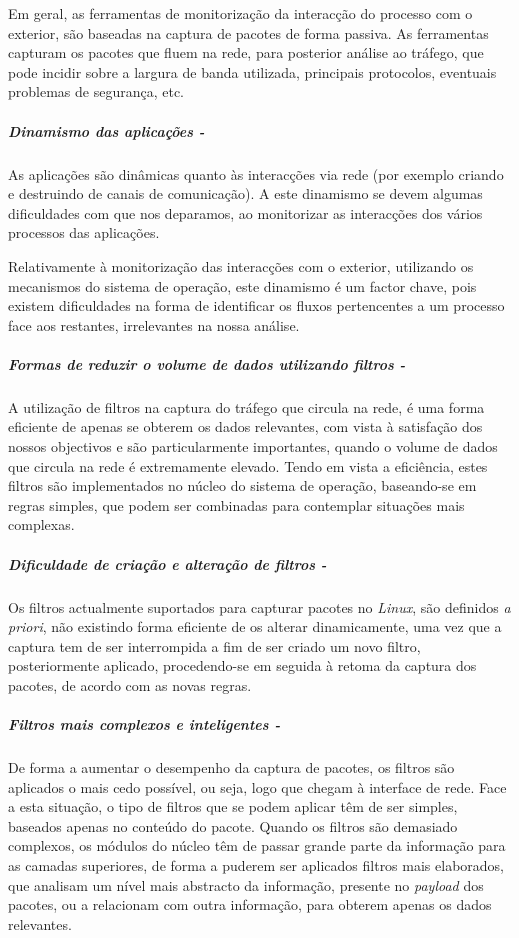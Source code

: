 Em geral, as ferramentas de monitorização da interacção do processo com o exterior, são baseadas na captura de pacotes de forma passiva.
As ferramentas capturam os pacotes que fluem na rede, para posterior análise ao tráfego, que pode incidir sobre a largura de banda utilizada, principais protocolos, eventuais problemas de segurança, etc.

\subparagraph*{Dinamismo das aplicações - }
As aplicações são dinâmicas quanto às interacções via rede (por exemplo criando e destruindo de canais de comunicação).
A este dinamismo se devem algumas dificuldades com que nos deparamos, ao monitorizar as interacções dos vários processos das aplicações.

Relativamente à monitorização das interacções com o exterior, utilizando os mecanismos do sistema de operação, este dinamismo é um factor chave, pois existem dificuldades na forma de identificar os fluxos pertencentes a um processo face aos restantes, irrelevantes na nossa análise.

\subparagraph*{Formas de reduzir o volume de dados utilizando filtros - }
A utilização de filtros na captura do tráfego que circula na rede, é uma forma eficiente de apenas se obterem os dados relevantes, com vista à satisfação dos nossos objectivos e são particularmente importantes, quando o volume de dados que circula na rede é extremamente elevado.
Tendo em vista a eficiência, estes filtros são implementados no núcleo do sistema de operação, baseando-se em regras simples, que podem ser combinadas para contemplar situações mais complexas.

\subparagraph*{Dificuldade de criação e alteração de filtros - }
Os filtros actualmente suportados para capturar pacotes no \textit{Linux}, são definidos \textit{a priori}, não existindo forma eficiente de os alterar dinamicamente, uma vez que a captura tem de ser interrompida a fim de ser criado um novo filtro, posteriormente aplicado, procedendo-se em seguida à retoma da captura dos pacotes, de acordo com as novas regras.

\subparagraph*{Filtros mais complexos e inteligentes - }
De forma a aumentar o desempenho da captura de pacotes, os filtros são aplicados o mais cedo possível, ou seja, logo que chegam à interface de rede.
Face a esta situação, o tipo de filtros que se podem aplicar têm de ser simples, baseados apenas no conteúdo do pacote.
Quando os filtros são demasiado complexos, os módulos do núcleo têm de passar grande parte da informação para as camadas superiores, de forma a puderem ser aplicados filtros mais elaborados, que analisam um nível mais abstracto da informação, presente no \textit{payload} dos pacotes, ou a relacionam com outra informação, para obterem apenas os dados relevantes.

